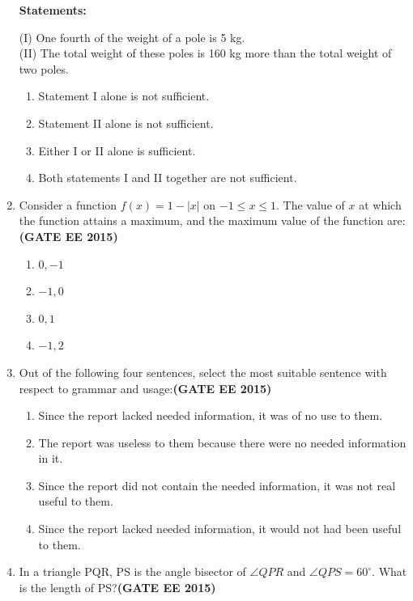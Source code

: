 \documentclass[a4paper,12pt]{exam}
\theoremstyle{remark}
\begin{document}
\begin{enumerate}
\textbf{Statements:}

(I) One fourth of the weight of a pole is 5 kg.\\
(II) The total weight of these poles is 160 kg more than the total weight of two poles.


\begin{enumerate}
    \item Statement I alone is not sufficient.
    \item Statement II alone is not sufficient.
    \item Either I or II alone is sufficient.
    \item Both statements I and II together are not sufficient.
\end{enumerate}

\item Consider a function $f(x) = 1 - |x|$ on $-1 \leq x \leq 1$. The value of $x$ at which the function attains a maximum, and the maximum value of the function are:\hfill{\textbf{(GATE EE 2015)}}

\begin{multicols}{4}
\begin{enumerate}
    \item $0, -1$
    \item $-1, 0$
    \item $0, 1$
    \item $-1, 2$
\end{enumerate}
\end{multicols}

\item Out of the following four sentences, select the most suitable sentence with respect to grammar and usage:\hfill{\textbf{(GATE EE 2015)}}


\begin{enumerate}
    \item Since the report lacked needed information, it was of no use to them.
    \item The report was useless to them because there were no needed information in it.
    \item Since the report did not contain the needed information, it was not real useful to them.
    \item Since the report lacked needed information, it would not had been useful to them.
\end{enumerate}
\item In a triangle PQR, PS is the angle bisector of $\angle QPR$ and $\angle QPS = 60^\circ$. What is the length of PS?\hfill{\textbf{(GATE EE 2015)}}



\end{enumerate}
\end{document}
